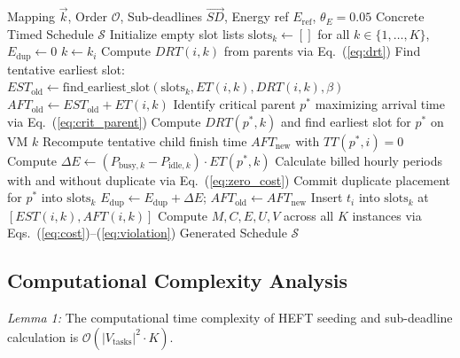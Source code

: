 \documentclass[journal]{IEEEtran}
\begin{document}
\begin{algorithm}[t]
\caption{Sub-Deadline Triggered Zero-Cost Duplication Procedure}
\label{alg:duplication}
\begin{algorithmic}[1]
\REQUIRE Mapping $\vec{k}$, Order $\mathcal{O}$, Sub-deadlines $\vec{SD}$, Energy ref $E_{\text{ref}}$, $\theta_E=0.05$
\ENSURE Concrete Timed Schedule $\mathcal{S}$
\STATE Initialize empty slot lists $\text{slots}_k \leftarrow []$ for all $k \in \{1,\dots,K\}$, $E_{\text{dup}} \leftarrow 0$
    \STATE $k \leftarrow k_i$
    \STATE Compute $DRT(i, k)$ from parents via Eq.~(\ref{eq:drt})
    \STATE Find tentative earliest slot: $EST_{\text{old}} \leftarrow \text{find\_earliest\_slot}(\text{slots}_k, ET(i,k), DRT(i,k), \beta)$
    \STATE $AFT_{\text{old}} \leftarrow EST_{\text{old}} + ET(i,k)$
        \STATE Identify critical parent $p^*$ maximizing arrival time via Eq.~(\ref{eq:crit_parent})
            \STATE Compute $DRT(p^*, k)$ and find earliest slot for $p^*$ on VM $k$
                \STATE Recompute tentative child finish time $AFT_{\text{new}}$ with $TT(p^*, i) = 0$
                    \STATE Compute $\Delta E \leftarrow (P_{\text{busy},k} - P_{\text{idle},k}) \cdot ET(p^*, k)$
                    \STATE Calculate billed hourly periods with and without duplicate via Eq.~(\ref{eq:zero_cost})
                        \STATE Commit duplicate placement for $p^*$ into $\text{slots}_k$
                        \STATE $E_{\text{dup}} \leftarrow E_{\text{dup}} + \Delta E$; $AFT_{\text{old}} \leftarrow AFT_{\text{new}}$
                    \ENDIF
                \ENDIF
            \ENDIF
        \ENDIF
    \ENDIF
    \STATE Insert $t_i$ into $\text{slots}_k$ at $[EST(i,k), AFT(i,k)]$
\ENDFOR
\STATE Compute $M, C, E, U, V$ across all $K$ instances via Eqs.~(\ref{eq:cost})--(\ref{eq:violation})
\RETURN Generated Schedule $\mathcal{S}$
\end{algorithmic}
\end{algorithm}

\subsection{Computational Complexity Analysis}
\textit{Lemma 1:} The computational time complexity of HEFT seeding and sub-deadline calculation is $\mathcal{O}(|V_{\text{tasks}}|^2 \cdot K)$.
\end{document}
